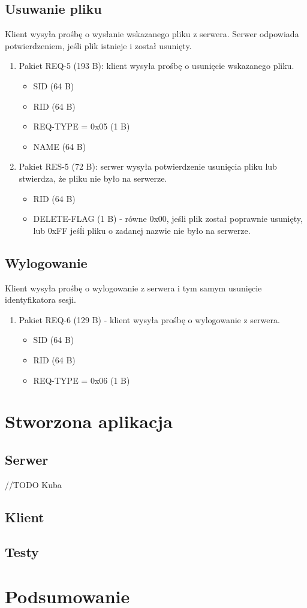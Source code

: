 \documentclass{article}
\begin{document}
	\subsection{Usuwanie pliku}
	Klient wysyła prośbę o wysłanie wskazanego pliku z serwera. Serwer odpowiada potwierdzeniem, jeśli plik istnieje i został usunięty. 
	\begin{enumerate}
		\item Pakiet REQ-5 (193 B): klient wysyła prośbę o usunięcie wskazanego pliku. 
		\begin{itemize}
			\item SID (64 B)
			\item RID (64 B)
			\item REQ-TYPE = 0x05 (1 B)
			\item NAME (64 B)
		\end{itemize}
	
		\item Pakiet RES-5 (72 B): serwer wysyła potwierdzenie usunięcia pliku lub stwierdza, że pliku nie było na serwerze. 
		\begin{itemize}
			\item RID (64 B)
			\item DELETE-FLAG (1 B) - równe 0x00, jeśli plik został poprawnie usunięty, lub 0xFF jeśĺi pliku o zadanej nazwie nie było na serwerze. 
		\end{itemize}
		
	\end{enumerate}

	\subsection{Wylogowanie}
	Klient wysyła prośbę o wylogowanie z serwera i tym samym usunięcie identyfikatora sesji. 
	\begin{enumerate}
		\item Pakiet REQ-6 (129 B) - klient wysyła prośbę o wylogowanie z serwera. 
		\begin{itemize}
			\item SID (64 B)
			\item RID (64 B)
			\item REQ-TYPE = 0x06 (1 B)
		\end{itemize}
		
		
	\end{enumerate}

	\section{Stworzona aplikacja}
	
	\subsection{Serwer}
	
	//TODO Kuba
	
	\subsection{Klient}
	
	\subsection{Testy}
	
	\section{Podsumowanie}

	
\end{document}

